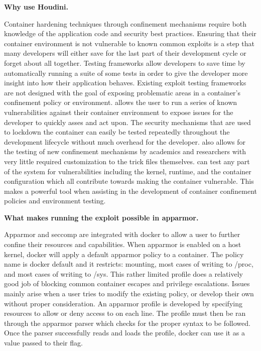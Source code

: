 \noindent\textbf{Why use Houdini.}

Container hardening techniques through confinement mechanisms require both knowledge of the application code and security best practices. Ensuring that their container environment is not vulnerable to known common exploits is a step that many developers will either save for the last part of their development cycle or forget about all together. Testing frameworks allow developers to save time by automatically running a suite of some tests in order to give the developer more insight into how their application behaves. Existing exploit testing frameworks are not designed with the goal of exposing problematic areas in a container's confinement policy or environment. \houdini allows the user to run a series of known vulnerabilities against their container environment to expose issues for the developer to quickly asses and act upon. The security mechanisms that are used to lockdown the container can easily be tested repeatedly throughout the development lifecycle without much overhead for the developer. \houdini also allows for the testing of new confinement mechanisms by academics and researchers with very little required customization to the trick files themselves. \houdini can test any part of the system for vulnerabilities including the kernel, runtime, and the container configuration which all contribute towards making the container vulnerable. This makes \houdini a powerful tool when assisting in the development of container confinement policies and environment testing.

\noindent\textbf{What makes running the exploit possible in apparmor.}

Apparmor and seccomp are integrated with docker to allow a user to further confine their resources and capabilities. When apparmor is enabled on a host kernel, docker will apply a default apparmor policy to a container. The policy name is docker default and it restricts: mounting, most cases of writing to /proc, and most cases of writing to /sys. This rather limited profile does a relatively good job of blocking common container escapes and privilege escalations. Issues mainly arise when a user tries to modify the existing policy, or develop their own without proper consideration. An apparmor profile is developed by specifying resources to allow or deny access to on each line. The profile must then be ran through the apparmor parser which checks for the proper syntax to be followed. Once the parser successfully reads and loads the profile, docker can use it as a value passed to their  flag.

